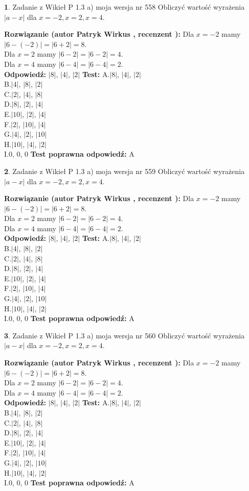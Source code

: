 \documentclass[12pt, a4paper]{article}
\theoremstyle{definition} %
\newtheorem{zad}{}
\newcommand{\zadStart}[1]{\begin{zad}#1\newline}
\newcommand{\zadStop}{\end{zad}}
\newcommand{\rozwStart}[2]{\noindent \textbf{Rozwiązanie (autor #1 , recenzent #2): }\newline}
\newcommand{\rozwStop}{\newline}
\newcommand{\odpStart}{\noindent \textbf{Odpowiedź:}\newline}
\newcommand{\odpStop}{\newline}
\newcommand{\testStart}{\noindent \textbf{Test:}\newline}
\newcommand{\testStop}{\newline}
\newcommand{\kluczStart}{\noindent \textbf{Test poprawna odpowiedź:}\newline}
\newcommand{\kluczStop}{\newline}
\begin{document}
\zadStart{Zadanie z Wikieł P 1.3 a) moja wersja nr 558}
Obliczyć wartość wyrażenia $|a - x|$ dla $x=-2,x=2,x=4$.
\zadStop
\rozwStart{Patryk Wirkus}{}
Dla $x = -2$ mamy $|6 - (-2)| = |6 + 2| = 8$.\\
Dla $x = 2$ mamy $|6 - 2| = |6 - 2| = 4$.\\
Dla $x = 4$ mamy $|6 - 4| = |6 - 4| = 2$.\\
\rozwStop
\odpStart
$|8|$, $|4|$, $|2|$
\odpStop
\testStart
A.$|8|$, $|4|$, $|2|$\\
B.$|4|$, $|8|$, $|2|$\\
C.$|2|$, $|4|$, $|8|$\\
D.$|8|$, $|2|$, $|4|$\\
E.$|10|$, $|2|$, $|4|$\\
F.$|2|$, $|10|$, $|4|$\\
G.$|4|$, $|2|$, $|10|$\\
H.$|10|$, $|4|$, $|2|$\\
I.$0$, $0$, $0$
\testStop
\kluczStart
A
\kluczStop



\zadStart{Zadanie z Wikieł P 1.3 a) moja wersja nr 559}
Obliczyć wartość wyrażenia $|a - x|$ dla $x=-2,x=2,x=4$.
\zadStop
\rozwStart{Patryk Wirkus}{}
Dla $x = -2$ mamy $|6 - (-2)| = |6 + 2| = 8$.\\
Dla $x = 2$ mamy $|6 - 2| = |6 - 2| = 4$.\\
Dla $x = 4$ mamy $|6 - 4| = |6 - 4| = 2$.\\
\rozwStop
\odpStart
$|8|$, $|4|$, $|2|$
\odpStop
\testStart
A.$|8|$, $|4|$, $|2|$\\
B.$|4|$, $|8|$, $|2|$\\
C.$|2|$, $|4|$, $|8|$\\
D.$|8|$, $|2|$, $|4|$\\
E.$|10|$, $|2|$, $|4|$\\
F.$|2|$, $|10|$, $|4|$\\
G.$|4|$, $|2|$, $|10|$\\
H.$|10|$, $|4|$, $|2|$\\
I.$0$, $0$, $0$
\testStop
\kluczStart
A
\kluczStop



\zadStart{Zadanie z Wikieł P 1.3 a) moja wersja nr 560}
Obliczyć wartość wyrażenia $|a - x|$ dla $x=-2,x=2,x=4$.
\zadStop
\rozwStart{Patryk Wirkus}{}
Dla $x = -2$ mamy $|6 - (-2)| = |6 + 2| = 8$.\\
Dla $x = 2$ mamy $|6 - 2| = |6 - 2| = 4$.\\
Dla $x = 4$ mamy $|6 - 4| = |6 - 4| = 2$.\\
\rozwStop
\odpStart
$|8|$, $|4|$, $|2|$
\odpStop
\testStart
A.$|8|$, $|4|$, $|2|$\\
B.$|4|$, $|8|$, $|2|$\\
C.$|2|$, $|4|$, $|8|$\\
D.$|8|$, $|2|$, $|4|$\\
E.$|10|$, $|2|$, $|4|$\\
F.$|2|$, $|10|$, $|4|$\\
G.$|4|$, $|2|$, $|10|$\\
H.$|10|$, $|4|$, $|2|$\\
I.$0$, $0$, $0$
\testStop
\kluczStart
A
\kluczStop
\end{document}
